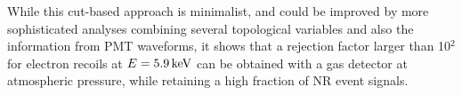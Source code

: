 \documentclass[physics,article,submit,moreauthors,pdftex]{Definitions/mdpi}
\newcommand{\fe}{\ensuremath{^{55}\textrm{Fe}}\xspace}
\newcommand{\ambe}{\ensuremath{\textrm{Am} \textrm{Be}}\xspace}
\newcommand{\keV}{\ensuremath{\,\textrm{ke\hspace{-.08em}V}}\xspace}
\begin{document}
%






While this cut-based
approach is minimalist, and could be improved by more sophisticated analyses combining several topological variables and also the information from PMT waveforms, it shows
that a rejection factor larger than 10$^2$ for electron recoils at $E=5.9\keV$ can be obtained with a
gas detector at atmospheric pressure, while
retaining a high fraction of NR event signals.


\end{document}
